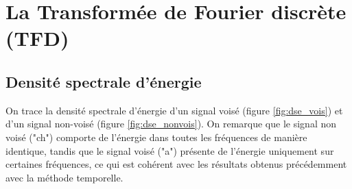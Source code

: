 \documentclass[french]{article}
\begin{document}
\FloatBarrier
\section{La Transformée de Fourier discrète (TFD)}

\subsection{Densité spectrale d'énergie}
On trace la densité spectrale d'énergie d'un signal voisé (figure \ref{fig:dse_vois}) et d'un signal non-voisé (figure \ref{fig:dse_nonvois}). On remarque que le signal non voisé ("ch") comporte de l'énergie dans toutes les fréquences de manière identique, tandis que le signal voisé ("a") présente de l'énergie uniquement sur certaines fréquences, ce qui est cohérent avec les résultats obtenus précédemment avec la méthode temporelle. %
\end{document}

